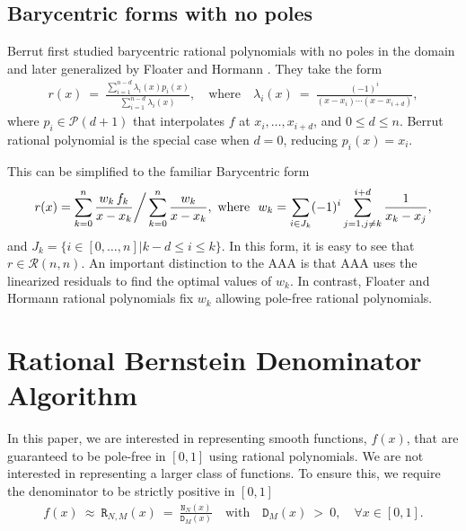 \documentclass{article}
\newcommand{\NN}{{\mathtt N}}
\newcommand{\DD}{{\mathtt D}}
\newcommand{\RR}{{\mathtt R}}
\begin{document}
\subsection{Barycentric forms with no poles}
{Berrut \cite{berrut_poleless_barycentric} first studied barycentric rational polynomials with no poles in the domain and later generalized by Floater and Hormann \cite{barycentric_poleless}. They take the form
\begin{eqnarray}
    r(x)\ =\ \frac{\sum_{i=1}^{n-d}\lambda_i(x)p_i(x)}{\sum_{i=1}^{n-d}\lambda_i(x)},\quad\text{where}\quad \lambda_i(x)\ =\ \frac{(-1)^i}{(x-x_i)\cdots (x-x_{i+d})},
\end{eqnarray}
where $p_i\in\mathcal{P}(d+1)$ that interpolates $f$ at $x_i,\ldots, x_{i+d}$, and $0\leq d\leq n$. Berrut rational polynomial is the special case when $d=0$, reducing $p_i(x)=x_i$.}

{This can be simplified to the familiar Barycentric form \cite{barycentric_poleless}
\begin{eqnarray}
    r(x) = \sum_{k=0}^n\frac{w_k\, f_k}{x-x_k}\bigg{/}\sum_{k=0}^{n}\frac{w_k}{x-x_k},\ \text{where}\ \   w_k = \sum_{i\in J_k}(-1)^i\sum_{j=1,j\neq k}^{i+d}\frac{1}{x_k-x_j},
\end{eqnarray}
and $J_k=\{i\in[0,\ldots, n] | k - d\leq i\leq k\}$. In this form, it is easy to see that $r\in \mathcal{R}(n,n)$. }
{An important distinction to the AAA is that AAA uses the linearized residuals to find the optimal values of $w_k$. In contrast, Floater and Hormann rational polynomials fix $w_k$ allowing pole-free rational polynomials.}

\section{Rational Bernstein Denominator Algorithm} 
{In this paper, we are interested in representing smooth functions, $f(x)$, that are guaranteed to be pole-free in $[0,1]$ using rational polynomials. We are not interested in representing a larger class of functions. To ensure this, we require the denominator to be strictly positive in $[0,1]$}
\begin{eqnarray}
f(x) \ \approx \ \RR_{N,M}(x) \ = \ \frac{\NN_{N}(x)}{\DD_{M}(x)} \quad \text{with} \quad \DD_{M}(x)\ >\ 0, \quad \forall x\in[0, 1].
\end{eqnarray}
\end{document}

